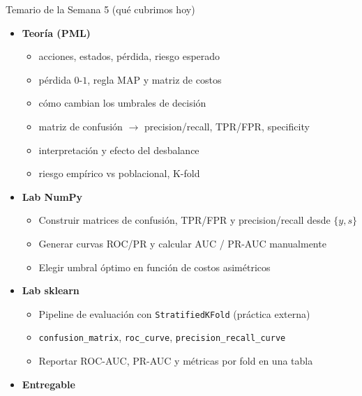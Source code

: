 \begin{frame}{Temario de la Semana 5 (qué cubrimos hoy)}
\begin{itemize}
  \item \textbf{Teoría (PML)}
  \begin{itemize}\small
    \item {} acciones, estados, pérdida, riesgo esperado \hfill {}
    \item {} pérdida \(0\text{-}1\), regla MAP y matriz de costos \hfill {}
    \item {} cómo cambian los umbrales de decisión \hfill {}
    \item {} matriz de confusión \(\rightarrow\) precision/recall, TPR/FPR, specificity \hfill {}
    \item {} interpretación y efecto del desbalance \hfill {}
    \item {} riesgo empírico vs poblacional, K-fold \hfill {}
  \end{itemize}
  \item \textbf{Lab NumPy}
  \begin{itemize}\small
    \item Construir matrices de confusión, TPR/FPR y precision/recall desde \(\{y,s\}\)
    \item Generar curvas ROC/PR y calcular AUC / PR-AUC manualmente
    \item Elegir umbral óptimo en función de costos asimétricos
  \end{itemize}
  \item \textbf{Lab sklearn}
  \begin{itemize}\small
    \item Pipeline de evaluación con \texttt{StratifiedKFold} (práctica externa)
    \item \texttt{confusion\_matrix}, \texttt{roc\_curve}, \texttt{precision\_recall\_curve}
    \item Reportar ROC-AUC, PR-AUC y métricas por fold en una tabla
  \end{itemize}
  \item \textbf{Entregable}
\end{itemize}
\end{frame}

